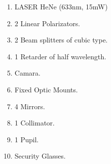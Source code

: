\label{sec:mat}
\begin{enumerate}
    \item LASER HeNe (633nm, 15mW)
    \item 2 Linear Polarizators.
    \item 2 Beam splitters of cubic type.
    \item 1 Retarder of half wavelength.
    \item Camara. 
    \item Fixed Optic Mounts.
    \item 4 Mirrors.
    \item 1 Collimator.
    \item 1 Pupil.
    \item Security Glasses.
\end{enumerate}